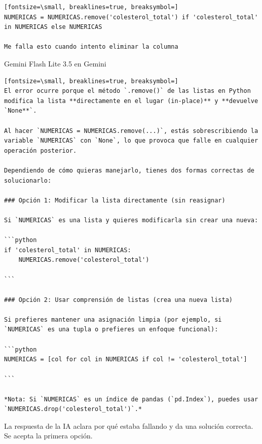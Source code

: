 \documentclass[12pt,a4paper,oneside]{book}
\begin{document}
\begin{iaprompt}
\begin{Verbatim}[fontsize=\small, breaklines=true, breaksymbol=]
NUMERICAS = NUMERICAS.remove('colesterol_total') if 'colesterol_total' in NUMERICAS else NUMERICAS

Me falla esto cuando intento eliminar la columna
\end{Verbatim}
\end{iaprompt}
\begin{iaresp}{Gemini Flash Lite 3.5 en Gemini}
\begin{Verbatim}[fontsize=\small, breaklines=true, breaksymbol=]
El error ocurre porque el método `.remove()` de las listas en Python modifica la lista **directamente en el lugar (in-place)** y **devuelve `None**`.

Al hacer `NUMERICAS = NUMERICAS.remove(...)`, estás sobrescribiendo la variable `NUMERICAS` con `None`, lo que provoca que falle en cualquier operación posterior.

Dependiendo de cómo quieras manejarlo, tienes dos formas correctas de solucionarlo:

### Opción 1: Modificar la lista directamente (sin reasignar)

Si `NUMERICAS` es una lista y quieres modificarla sin crear una nueva:

```python
if 'colesterol_total' in NUMERICAS:
    NUMERICAS.remove('colesterol_total')

```

### Opción 2: Usar comprensión de listas (crea una nueva lista)

Si prefieres mantener una asignación limpia (por ejemplo, si `NUMERICAS` es una tupla o prefieres un enfoque funcional):

```python
NUMERICAS = [col for col in NUMERICAS if col != 'colesterol_total']

```

*Nota: Si `NUMERICAS` es un índice de pandas (`pd.Index`), puedes usar `NUMERICAS.drop('colesterol_total')`.*
\end{Verbatim}
\end{iaresp}
\begin{iaanalisis}
La respuesta de la IA aclara por qué estaba fallando y da una solución correcta. Se acepta la primera opción.
\end{iaanalisis}
\end{document}

